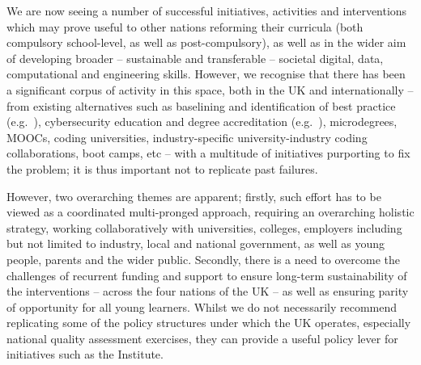 \documentclass[conference]{IEEEtran}
\begin{document}
We are now seeing a number of successful initiatives, activities and
interventions which may prove useful to other nations reforming their
curricula (both compulsory school-level, as well as post-compulsory),
as well as in the wider aim of developing broader -- sustainable and
transferable -- societal digital, data, computational and engineering
skills. However, we recognise that there has been a significant corpus
of activity in this space, both in the UK and internationally -- from
existing alternatives such as baselining and identification of best
practice (e.g.~\cite{murphy-et-al:programming2017}), cybersecurity
education and degree accreditation (e.g.~\cite{crick-et-al:fie2019}),
microdegrees, MOOCs, coding universities, industry-specific
university-industry coding collaborations, boot camps, etc -- with a
multitude of initiatives purporting to fix the problem; it is thus
important not to replicate past failures.



However, two overarching themes are apparent; firstly, such effort has
to be viewed as a coordinated multi-pronged approach, requiring an
overarching holistic strategy, working collaboratively with
universities, colleges, employers including but not limited to
industry, local and national government, as well as young people,
parents and the wider public. Secondly, there is a need to overcome
the challenges of recurrent funding and support to ensure long-term
sustainability of the interventions -- across the four nations of the
UK -- as well as ensuring parity of opportunity for all young
learners. Whilst we do not necessarily recommend replicating some of
the policy structures under which the UK operates, especially national
quality assessment exercises, they can provide a useful policy lever
for initiatives such as the Institute.
\end{document}

